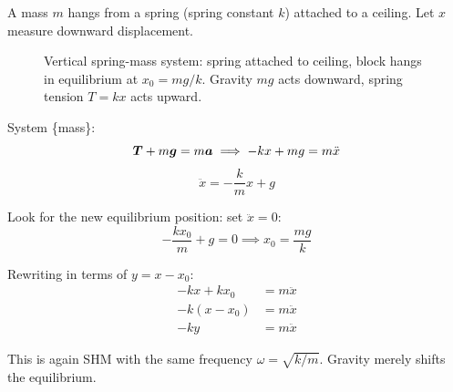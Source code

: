 \begin{example}
A mass $m$ hangs from a spring (spring constant $k$) attached to a ceiling. Let $x$ measure downward displacement.

\begin{figure}[H]
\begin{center}
\end{center}
\caption{Vertical spring-mass system: spring attached to ceiling, block hangs in equilibrium at $x_0 = mg/k$. Gravity $mg$ acts downward, spring tension $T = kx$ acts upward.}
\label{fig:vertical_spring}
\end{figure}

System \{mass\}:
\[
\vect{T} + m\lvect{g} = m\lvect{a} \implies -kx + mg = m\ddot{x}
\]
\[
\ddot{x} = -\frac{k}{m}x + g
\]

Look for the new equilibrium position: set $\ddot{x} = 0$:
\[
-\frac{k x_0}{m} + g = 0 \implies x_0 = \frac{mg}{k}
\]

Rewriting in terms of $y = x - x_0$:
\begin{align*}
-kx + kx_0 &= m\ddot{x} \\
-k(x - x_0) &= m\ddot{x} \\
-ky &= m\ddot{x}
\end{align*}

This is again SHM with the same frequency $\omega = \sqrt{k/m}$. Gravity merely shifts the equilibrium.
\end{example}

